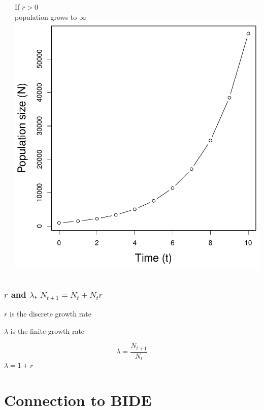 \documentclass[color=usenames,dvipsnames]{beamer}\usepackage[]{graphicx}\usepackage[]{color}
\begin{document}
\begin{frame}
\begin{columns}
\begin{column}{0.33\textwidth}
    \end{column}
    \begin{column}{0.33\textwidth}
      \small
      \centering
      If $r > 0$ \\ population grows to $\infty$ \\
      \includegraphics[width=\textwidth]{figs/rg0}
    \end{column}
  \end{columns}
\end{frame}




\begin{frame}
  \frametitle{$r$ and $\lambda$, $N_{t+1} = N_t + N_tr$}
  \Large
  $r$ is the discrete growth rate \par
  \vspace{0.5cm}
  $\lambda$ is the finite growth rate \par
  \[
  \lambda = \frac{N_{t+1}}{N_t}
  \]
  \pause
  \vspace{0.5cm}
  $\lambda = 1 + r$
\end{frame}



\section{Connection to BIDE}
\end{document}
